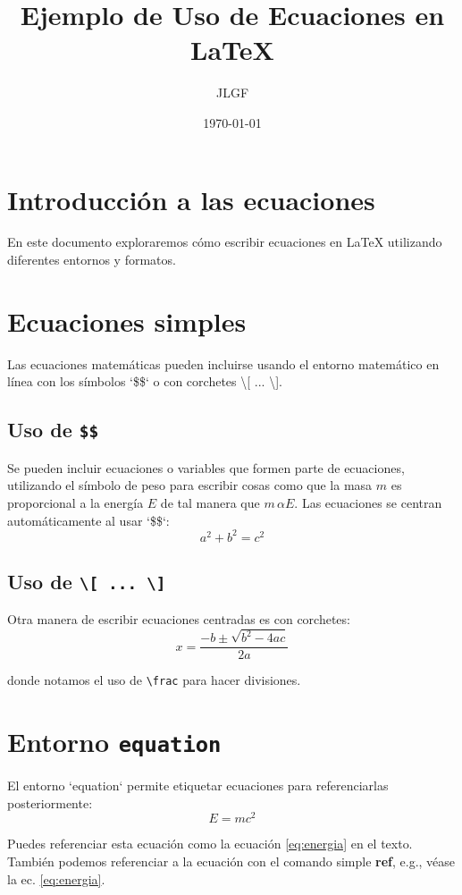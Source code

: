 \documentclass[12pt]{article}
\title{Ejemplo de Uso de Ecuaciones en \LaTeX}
\author{JLGF}
\date{\today}
\begin{document}
\maketitle

\section{Introducción a las ecuaciones}
En este documento exploraremos cómo escribir ecuaciones en \LaTeX{} utilizando diferentes entornos y formatos.

\section{Ecuaciones simples}
Las ecuaciones matemáticas pueden incluirse usando el entorno matemático en línea con los símbolos `\$\$` o con corchetes \textbackslash[ ... \textbackslash].

\subsection{Uso de \texttt{\$\$}}

Se pueden incluir ecuaciones o variables que formen parte de ecuaciones, utilizando el símbolo de peso para escribir cosas como que la masa $m$ es proporcional a la energía $E$ de tal manera que $m\,\alpha E$.
Las ecuaciones se centran automáticamente al usar `\$\$`:
$$ a^2 + b^2 = c^2 $$

\subsection{Uso de \texttt{\textbackslash[ ... \textbackslash]}}
Otra manera de escribir ecuaciones centradas es con corchetes:
\[
x = \frac{-b \pm \sqrt{b^2 - 4ac}}{2a}
\]


donde notamos el uso de \texttt{\textbackslash frac} para hacer divisiones. 

\section{Entorno \texttt{equation}}
El entorno `equation` permite etiquetar ecuaciones para referenciarlas posteriormente:
\begin{equation}
E = mc^2
\label{eq:energia}
\end{equation}

Puedes referenciar esta ecuación como la ecuación \eqref{eq:energia} en el texto. También podemos referenciar a la ecuación con el comando simple \textbf{ref}, e.g., véase la ec. \ref{eq:energia}.
\end{document}
